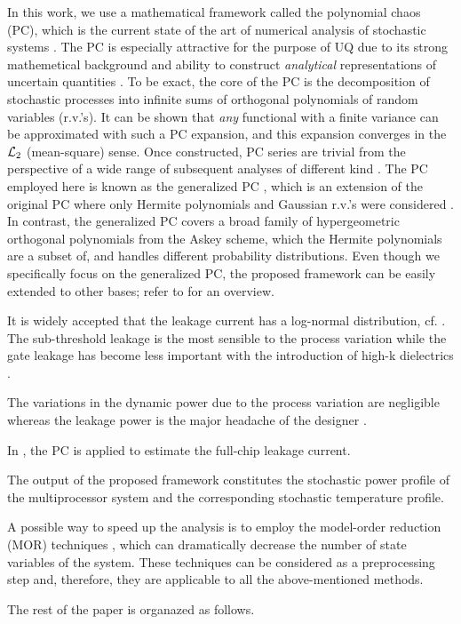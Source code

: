 In this work, we use a mathematical framework called the polynomial chaos (PC), which is the current state of the art of numerical analysis of stochastic systems \cite{xiu2009}. The PC is especially attractive for the purpose of UQ due to its strong mathemetical background and ability to construct \emph{analytical} representations of uncertain quantities \cite{eldred2009}. To be exact, the core of the PC is the decomposition of stochastic processes into infinite sums of orthogonal polynomials of random variables (r.v.'s). It can be shown that \emph{any} functional with a finite variance can be approximated with such a PC expansion, and this expansion converges in the $\mathcal{L}_{2}$ (mean-square) sense. Once constructed, PC series are trivial from the perspective of a wide range of subsequent analyses of different kind \cite{eldred2009}. The PC employed here is known as the generalized PC \cite{xiu2002}, which is an extension of the original PC where only Hermite polynomials and Gaussian r.v.'s were considered \cite{ghanem1991}. In contrast, the generalized PC covers a broad family of hypergeometric orthogonal polynomials from the Askey scheme, which the Hermite polynomials are a subset of, and handles different probability distributions. Even though we specifically focus on the generalized PC, the proposed framework can be easily extended to other bases; refer to \cite{maitre2010} for an overview.

It is widely accepted that the leakage current has a log-normal distribution, cf. \cite{juan2012, srivastava2010}. The sub-threshold leakage is the most sensible to the process variation while the gate leakage has become less important with the introduction of high-k dielectrics \cite{juan2012}.

The variations in the dynamic power due to the process variation are negligible whereas the leakage power is the major headache of the designer \cite{juan2012, srivastava2010}.

In \cite{shen2009}, the PC is applied to estimate the full-chip leakage current.

The output of the proposed framework constitutes the stochastic power profile of the multiprocessor system and the corresponding stochastic temperature profile.

A possible way to speed up the analysis is to employ the model-order reduction (MOR) techniques \cite{benner2011}, which can dramatically decrease the number of state variables of the system. These techniques can be considered as a preprocessing step and, therefore, they are applicable to all the above-mentioned methods.

The rest of the paper is organazed as follows.

